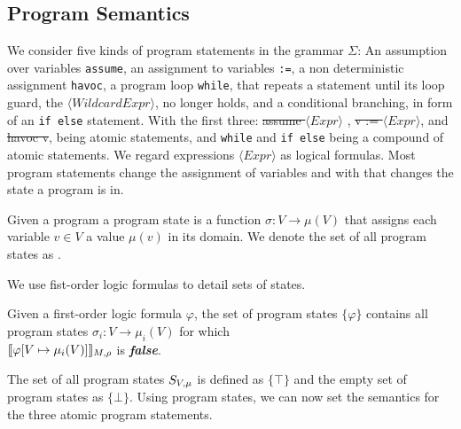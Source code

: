 \subsection{Program Semantics}
We consider five kinds of program statements in the grammar $\Sigma$: An assumption over variables \texttt{assume}, an assignment to variables \texttt{:=}, a non deterministic assignment \texttt{havoc}, a program loop \texttt{while}, that repeats a statement until its loop guard, the $\langle WildcardExpr \rangle$, no longer holds, and a conditional branching, in form of an \texttt{if else} statement. With the first three: \st{assume $\langle Expr \rangle$ }, \st{v := $\langle Expr \rangle$}, and \st{havoc v}, being atomic statements, and \texttt{while} and \texttt{if else} being a compound of atomic statements.
We regard expressions $\langle Expr \rangle$ as logical formulas. Most program statements change the assignment of variables and with that changes the state a program is in. 
\begin{mydef}
	Given a program \prg a program state is a function $\sigma: V \rightarrow \mu(V)$ that assigns each variable $v \in V$ a value $\mu(v)$ in its domain. We denote the set of all program states as \stateSpace.
\end{mydef}
We use fist-order logic formulas to detail sets of states.
\begin{mydef}
	Given a first-order logic formula $\varphi$, the set of program states $\{ \varphi \}$ contains all program states $\sigma_i: V \rightarrow \mu_i(V)$ for which \\ $\llbracket \varphi [V\mapsto \mu_i(V) ] \rrbracket_{M, \rho}$ is \textit{\textbf{false}}.
\end{mydef}
The set of all program states $S_{V, \mu}$ is defined as $\{\top\}$ and the empty set of program states as $\{\bot\}$.
Using program states, we can now set the semantics for the three atomic program statements.
